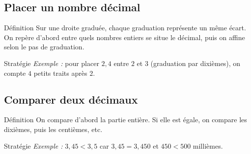 
\semaineinvisible
{} 

\vfill
\subsection{Placer un nombre décimal}

\begin{regle}{Définition}
Sur une droite graduée, chaque graduation représente un même écart. On repère d'abord entre quels nombres entiers se situe le décimal, puis on affine selon le pas de graduation.
\end{regle}

\vspace{6pt}
\begin{astuce}{Stratégie}
\textit{Exemple :} pour placer $2,4$ entre $2$ et $3$ (graduation par dixièmes), on compte $4$ petits traits après $2$.
\end{astuce}

\vspace{10pt}
\subsection{Comparer deux décimaux}

\begin{regle}{Définition}
On compare d'abord la partie entière. Si elle est égale, on compare les dixièmes, puis les centièmes, etc.
\end{regle}

\vspace{6pt}
\begin{astuce}{Stratégie}
\textit{Exemple :} $3,45 < 3,5$ car $3,45 = 3,450$ et $450 < 500$ millièmes.
\end{astuce}

\vspace{10pt}
